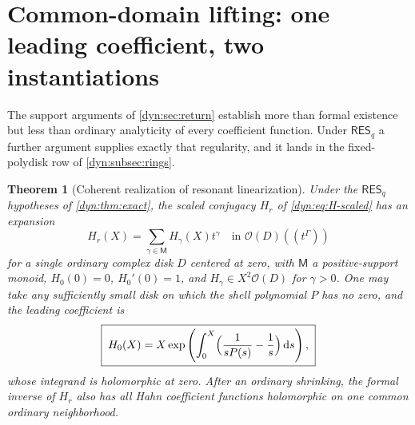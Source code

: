 \documentclass[11pt,letterpaper]{article}
\newtheorem{theorem}{Theorem}[section]
\theoremstyle{definition}
\theoremstyle{remark}
\newcommand{\OO}{\mathcal O}
\newcommand{\dd}{\,\mathrm d}
\newcommand{\resq}{\mathsf{RES}_q}
\numberwithin{equation}{section}
\begin{document}
\section{Common-domain lifting: one leading coefficient, two instantiations}
\label{dyn:sec:coherent}

The support arguments of \cref{dyn:sec:return} establish more than formal
existence but less than ordinary analyticity of every coefficient function.
Under $\resq$ a further argument supplies exactly that regularity, and it
lands in the fixed-polydisk row of \cref{dyn:subsec:rings}.

\begin{theorem}[Coherent realization of resonant linearization]
\label{dyn:thm:coherent}
Under the $\resq$ hypotheses of \cref{dyn:thm:exact}, the scaled conjugacy
$H_r$ of \eqref{dyn:eq:H-scaled} has an expansion
\begin{equation}\label{dyn:eq:coherent-expansion}
 H_r(X)=\sum_{\gamma\in\mathsf M}H_\gamma(X)t^{\gamma}
 \quad\text{in }\OO(D)((t^{\Gamma}))
\end{equation}
for a \emph{single} ordinary complex disk $D$ centered at zero, with
$\mathsf M$ a positive-support monoid, $H_0(0)=0$, $H_0'(0)=1$, and
$H_\gamma\in X^{2}\OO(D)$ for $\gamma>0$. One may take any sufficiently
small disk on which the shell polynomial $P$ has no zero, and the leading
coefficient is
\begin{equation}\label{dyn:eq:H0}
 \boxed{\;H_0(X)=X\exp\left(\int_0^{X}
 \Bigl(\frac1{sP(s)}-\frac1s\Bigr)\dd s\right),\;}
\end{equation}
whose integrand is holomorphic at zero. After an ordinary shrinking, the
formal inverse of $H_r$ also has all Hahn coefficient functions holomorphic
on one common ordinary neighborhood.
\end{theorem}
\end{document}

